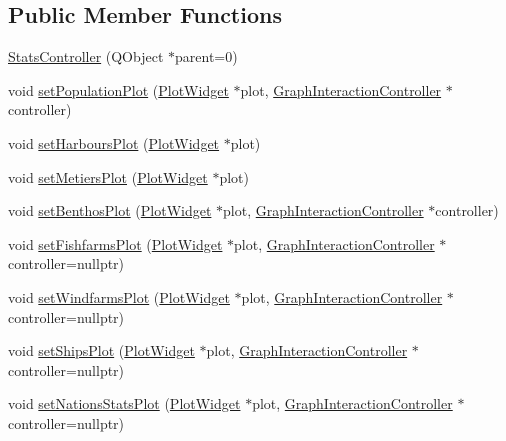 \subsection*{Public Member Functions}
\begin{DoxyCompactItemize}
\item 
\mbox{\hyperlink{class_stats_controller_a8c116845a623cf998023aaa02b33f502}{Stats\+Controller}} (Q\+Object $\ast$parent=0)
\item 
void \mbox{\hyperlink{class_stats_controller_af934ef78656ffb0a9068b0983bba30c7}{set\+Population\+Plot}} (\mbox{\hyperlink{class_plot_widget}{Plot\+Widget}} $\ast$plot, \mbox{\hyperlink{class_graph_interaction_controller}{Graph\+Interaction\+Controller}} $\ast$controller)
\item 
void \mbox{\hyperlink{class_stats_controller_a00915ed17a2bbe0fa01d640b63555adb}{set\+Harbours\+Plot}} (\mbox{\hyperlink{class_plot_widget}{Plot\+Widget}} $\ast$plot)
\item 
void \mbox{\hyperlink{class_stats_controller_a077bb29233dbc213fa883f1aa9d7fb84}{set\+Metiers\+Plot}} (\mbox{\hyperlink{class_plot_widget}{Plot\+Widget}} $\ast$plot)
\item 
void \mbox{\hyperlink{class_stats_controller_ac789cf514d6e03a4f35871b4347a113c}{set\+Benthos\+Plot}} (\mbox{\hyperlink{class_plot_widget}{Plot\+Widget}} $\ast$plot, \mbox{\hyperlink{class_graph_interaction_controller}{Graph\+Interaction\+Controller}} $\ast$controller)
\item 
void \mbox{\hyperlink{class_stats_controller_ad8ba34200eb767cedc2965db24b95ef0}{set\+Fishfarms\+Plot}} (\mbox{\hyperlink{class_plot_widget}{Plot\+Widget}} $\ast$plot, \mbox{\hyperlink{class_graph_interaction_controller}{Graph\+Interaction\+Controller}} $\ast$controller=nullptr)
\item 
void \mbox{\hyperlink{class_stats_controller_a5c770c9a993c28e83aea591974ab80dd}{set\+Windfarms\+Plot}} (\mbox{\hyperlink{class_plot_widget}{Plot\+Widget}} $\ast$plot, \mbox{\hyperlink{class_graph_interaction_controller}{Graph\+Interaction\+Controller}} $\ast$controller=nullptr)
\item 
void \mbox{\hyperlink{class_stats_controller_a9deaf4dfc3277893d7870e0499e94b69}{set\+Ships\+Plot}} (\mbox{\hyperlink{class_plot_widget}{Plot\+Widget}} $\ast$plot, \mbox{\hyperlink{class_graph_interaction_controller}{Graph\+Interaction\+Controller}} $\ast$controller=nullptr)
\item 
void \mbox{\hyperlink{class_stats_controller_ad58717c9b4d91e5c61039ad6fe9a03e8}{set\+Nations\+Stats\+Plot}} (\mbox{\hyperlink{class_plot_widget}{Plot\+Widget}} $\ast$plot, \mbox{\hyperlink{class_graph_interaction_controller}{Graph\+Interaction\+Controller}} $\ast$controller=nullptr)

\end{DoxyCompactItemize}
